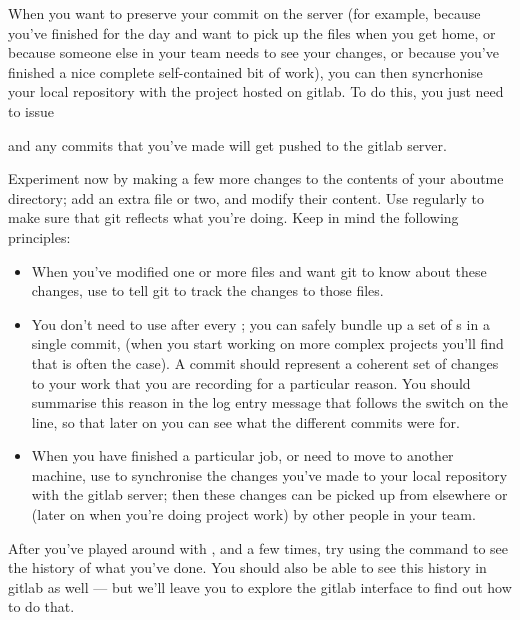 When you want to preserve your commit on the server (for example, because you've finished for the day and want to pick up the files when you get home, or because someone else in your team needs to see your changes, or because you've finished a nice complete self-contained bit of work), you can then syncrhonise your local repository with the project hosted on gitlab. To do this, you just need to issue 


and any commits that you've made will get pushed to the gitlab server. 

Experiment now by making a few more changes to the contents of your aboutme directory; add an extra file or two, and modify their content. Use  regularly to make sure that git reflects what you're doing. Keep in mind the following principles:

\begin{itemize}
\item When you've modified one or more files and want git to know about these changes, use  to tell git to track the changes to those files.

\item You don't need to use  after every ;
  you can safely bundle up a set of s in a single commit,
  (when you start working on more complex projects you'll find that is often the case). A    commit should represent a coherent set
  of changes to your work that you are recording for a particular
  reason. You should summarise this reason in the log entry message
  that follows the  switch on the  line, so that
  later on you can see what the different commits were for.

\item When you have finished a particular job, or need to move to another machine, use  to synchronise the changes you've made to your local repository with the gitlab server; then these changes can be picked up from elsewhere or (later on when you're doing project work) by other people in your team. 
\end{itemize}

After you've played around with ,  and  a few times, try using the  command to see the history of what you've done. You should also be able to see this history in gitlab as well --- but we'll leave you to explore the gitlab interface to find out how to do that. 

